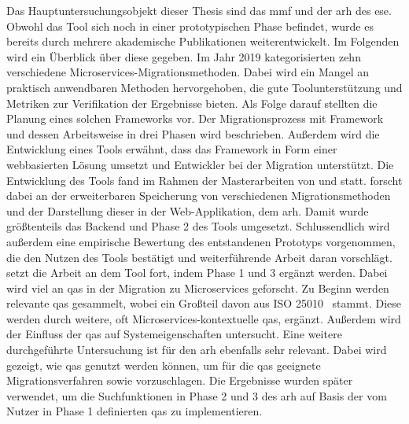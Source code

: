 Das Hauptuntersuchungsobjekt dieser Thesis sind das \gls{mmf} und der \gls{arh} des \gls{ese}.
Obwohl das Tool sich noch in einer prototypischen Phase befindet, wurde es bereits durch mehrere akademische Publikationen weiterentwickelt.
Im Folgenden wird ein Überblick über diese gegeben.
Im Jahr 2019 kategorisierten  zehn verschiedene Microservices-Migrationsmethoden.
Dabei wird ein Mangel an praktisch anwendbaren Methoden hervorgehoben, die gute Toolunterstützung und Metriken zur Verifikation der Ergebnisse bieten.
Als Folge darauf stellten  die Planung eines solchen Frameworks vor.
Der Migrationsprozess mit Framework und dessen Arbeitsweise in drei Phasen wird beschrieben.
Außerdem wird die Entwicklung eines Tools erwähnt, dass das Framework in Form einer webbasierten Lösung umsetzt und Entwickler bei der Migration unterstützt.
Die Entwicklung des Tools fand im Rahmen der Masterarbeiten von  und  statt.
\citeauthor{master-tobias-haller} forscht dabei an der erweiterbaren Speicherung von verschiedenen Migrationsmethoden und der Darstellung dieser in der Web-Applikation, dem \gls{arh}.
Damit wurde größtenteils das Backend und Phase 2 des Tools umgesetzt.
Schlussendlich wird außerdem eine empirische Bewertung des entstandenen Prototyps vorgenommen, die den Nutzen des Tools bestätigt und weiterführende Arbeit daran vorschlägt.
 setzt die Arbeit an dem Tool fort, indem Phase 1 und 3 ergänzt werden.
Dabei wird viel an \glspl{qa} in der Migration zu Microservices geforscht.
Zu Beginn werden relevante \glspl{qa} gesammelt, wobei ein Großteil davon aus ISO 25010~\cite{ISO-25010} stammt.
Diese werden durch weitere, oft Microservices-kontextuelle \glspl{qa}, ergänzt.
Außerdem wird der Einfluss der \glspl{qa} auf Systemeigenschaften untersucht.
Eine weitere durchgeführte Untersuchung ist für den \gls{arh} ebenfalls sehr relevant.
Dabei wird gezeigt, wie \glspl{qa} genutzt werden können, um für die \glspl{qa} geeignete Migrationsverfahren sowie \bpp vorzuschlagen.
Die Ergebnisse wurden später verwendet, um die Suchfunktionen in Phase 2 und 3 des \gls{arh} auf Basis der vom Nutzer in Phase 1 definierten \glspl{qa} zu implementieren.

